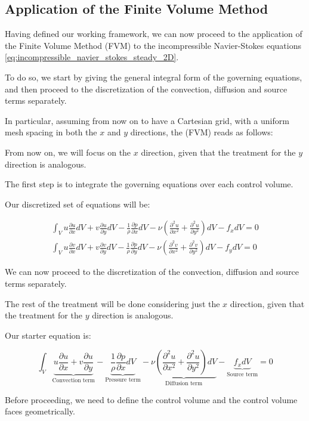 \subsection{Application of the Finite Volume Method}
\label{subsec:application_of_the_finite_volume_method}

Having defined our working framework, we can now proceed to the application of the Finite Volume Method (FVM) to the incompressible Navier-Stokes equations \ref{eq:incompressible_navier_stokes_steady_2D}.

To do so, we start by giving the general integral form of the governing equations, and then proceed to the discretization of the convection, diffusion and source terms separately.

In particular, assuming from now on to have a Cartesian grid, with a uniform mesh spacing in both the $x$ and $y$ directions, the (FVM) reads as follows:




From now on, we will focus on the $x$ direction, given that the treatment for the $y$ direction is analogous.

The first step is to integrate the governing equations over each control volume.

Our discretized set of equations will be:

\begin{align}
    \int_{V} u \frac{\partial u}{\partial x} dV + v \frac{\partial u}{\partial y} dV - \frac{1}{\rho} \frac{\partial p}{\partial x} dV - \nu \left( \frac{\partial^2 u}{\partial x^2} + \frac{\partial^2 u}{\partial y^2} \right) dV - f_x dV = 0 \\
    \int_{V} u \frac{\partial v}{\partial x} dV + v \frac{\partial v}{\partial y} dV - \frac{1}{\rho} \frac{\partial p}{\partial y} dV - \nu \left( \frac{\partial^2 v}{\partial x^2} + \frac{\partial^2 v}{\partial y^2} \right) dV - f_y dV = 0
\end{align}

We can now proceed to the discretization of the convection, diffusion and source terms separately.

The rest of the treatment will be done considering just the $x$ direction, given that the treatment for the $y$ direction is analogous.

Our starter equation is:

\begin{equation}
    \int_{V} \underbrace{u \frac{\partial u}{\partial x} + v \frac{\partial u}{\partial y}}_{\text{Convection term}} - \underbrace{\frac{1}{\rho} \frac{\partial p}{\partial x} dV}_{\text{Pressure term}} - \underbrace{\nu \left( \frac{\partial^2 u}{\partial x^2} + \frac{\partial^2 u}{\partial y^2} \right) dV}_{\text{Diffusion term}} - \underbrace{f_x dV}_{\text{Source term}} = 0
    \label{eq:inc_navier_stokes_steady_2D_discretized_x}
\end{equation}

Before proceeding, we need to define the control volume and the control volume faces geometrically.

